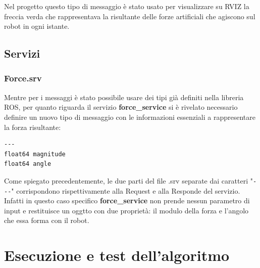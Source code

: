 \documentclass[Lau, binding=0.6cm, oneside]{sapthesis}
\begin{document}
Nel progetto questo tipo di messaggio è stato usato per visualizzare su RVIZ la freccia verda che rappresentava la risultante delle forze artificiali che agiscono sul robot in ogni istante.

\section{Servizi}
\subsection{Force.srv}
Mentre per i messaggi è stato possibile usare dei tipi già definiti nella libreria ROS, per quanto riguarda il servizio \textbf{force\_service} si è rivelato necessario definire un nuovo tipo di messaggio con le informazioni essenziali a rappresentare la forza risultante:

\begin{lstlisting}
---
float64 magnitude
float64 angle
\end{lstlisting}

Come spiegato precedentemente, le due parti del file .srv separate dai caratteri "\lstinline{---}" corrispondono rispettivamente alla Request e alla Responde del servizio.
Infatti in questo caso specifico \textbf{force\_service} non prende nessun parametro di input e restituisce un oggtto con due proprietà: il modulo della forza e l'angolo che essa forma con il robot.

\chapter{Esecuzione e test dell'algoritmo}
\end{document}
